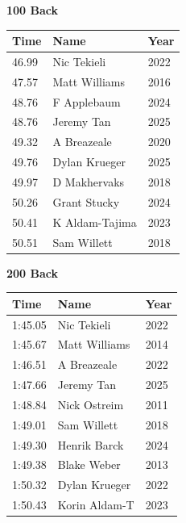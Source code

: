 \vspace{1.2em}
\noindent\begin{minipage}[t]{0.48\textwidth}
\centering
\textbf{\textcolor{teamprimary}{100 Back}}\par
\vspace{0.5em}
\centering
\small
\renewcommand{\arraystretch}{1.0}
\setlength{\tabcolsep}{4pt}
\begin{tabular}{@{}p{1.8cm}p{3.0cm}p{1.0cm}@{}}
\toprule
\textbf{Time} & \textbf{Name} & \textbf{Year} \\
\midrule
46.99 & Nic Tekieli & 2022 \\
47.57 & Matt Williams & 2016 \\
48.76 & F Applebaum & 2024 \\
48.76 & Jeremy Tan & 2025 \\
49.32 & A Breazeale & 2020 \\
49.76 & Dylan Krueger & 2025 \\
49.97 & D Makhervaks & 2018 \\
50.26 & Grant Stucky & 2024 \\
50.41 & K Aldam-Tajima & 2023 \\
50.51 & Sam Willett & 2018 \\
\bottomrule
\end{tabular}
\end{minipage}
\hfill
\begin{minipage}[t]{0.48\textwidth}
\centering
\textbf{\textcolor{teamprimary}{200 Back}}\par
\vspace{0.5em}
\centering
\small
\renewcommand{\arraystretch}{1.0}
\setlength{\tabcolsep}{4pt}
\begin{tabular}{@{}p{1.8cm}p{3.0cm}p{1.0cm}@{}}
\toprule
\textbf{Time} & \textbf{Name} & \textbf{Year} \\
\midrule
1:45.05 & Nic Tekieli & 2022 \\
1:45.67 & Matt Williams & 2014 \\
1:46.51 & A Breazeale & 2022 \\
1:47.66 & Jeremy Tan & 2025 \\
1:48.84 & Nick Ostreim & 2011 \\
1:49.01 & Sam Willett & 2018 \\
1:49.30 & Henrik Barck & 2024 \\
1:49.38 & Blake Weber & 2013 \\
1:50.32 & Dylan Krueger & 2022 \\
1:50.43 & Korin Aldam-T & 2023 \\
\bottomrule
\end{tabular}
\end{minipage}
